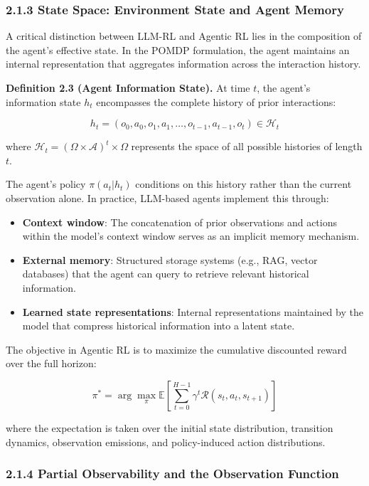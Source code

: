 \subsubsection{2.1.3 State Space: Environment State and Agent Memory}

A critical distinction between LLM-RL and Agentic RL lies in the composition of the agent's effective state. In the POMDP formulation, the agent maintains an internal representation that aggregates information across the interaction history.

\textbf{Definition 2.3 (Agent Information State).} At time $t$, the agent's information state $h_t$ encompasses the complete history of prior interactions:

$$h_t = (o_0, a_0, o_1, a_1, \ldots, o_{t-1}, a_{t-1}, o_t) \in \mathcal{H}_t$$

where $\mathcal{H}_t = (\Omega \times \mathcal{A})^t \times \Omega$ represents the space of all possible histories of length $t$.

The agent's policy $\pi(a_t | h_t)$ conditions on this history rather than the current observation alone. In practice, LLM-based agents implement this through:

\begin{itemize}
    \item \textbf{Context window}: The concatenation of prior observations and actions within the model's context window serves as an implicit memory mechanism.
    \item \textbf{External memory}: Structured storage systems (e.g., RAG, vector databases) that the agent can query to retrieve relevant historical information.
    \item \textbf{Learned state representations}: Internal representations maintained by the model that compress historical information into a latent state.

\end{itemize}
The objective in Agentic RL is to maximize the cumulative discounted reward over the full horizon:

$$\pi^* = \arg\max_{\pi} \mathbb{E}\left[\sum_{t=0}^{H-1} \gamma^t \mathcal{R}(s_t, a_t, s_{t+1}) \right]$$

where the expectation is taken over the initial state distribution, transition dynamics, observation emissions, and policy-induced action distributions.

\subsubsection{2.1.4 Partial Observability and the Observation Function}

